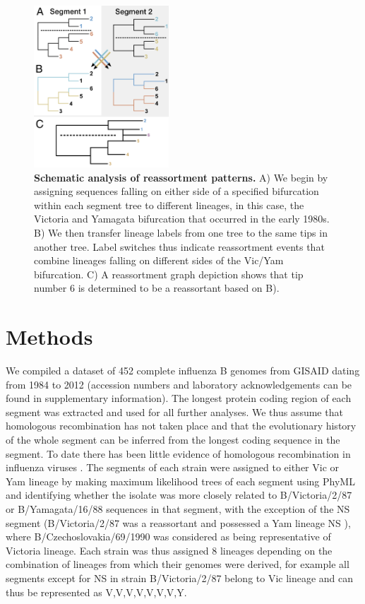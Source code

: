 \documentclass[11pt,oneside,letterpaper]{article}
\begin{document}
\begin{figure}[h]
 \centering		
	\includegraphics[width=0.45\textwidth]{figures/TreeFigure2}
	\caption{\textbf{Schematic analysis of reassortment patterns.}
	A) We begin by assigning sequences falling on either side of a specified bifurcation within each segment tree to different lineages, in this case, the Victoria and Yamagata bifurcation that occurred in the early 1980s.
	B) We then transfer lineage labels from one tree to the same tips in another tree.
	Label switches thus indicate reassortment events that combine lineages falling on different sides of the Vic/Yam bifurcation.
	C) A reassortment graph depiction shows that tip number 6 is determined to be a reassortant based on B).
	}
	\label{methodFig}
\end{figure}

\section*{Methods}
We compiled a dataset of 452 complete influenza B genomes from GISAID \cite{GISAID} dating from 1984 to 2012 (accession numbers and laboratory acknowledgements can be found in supplementary information).
The longest protein coding region of each segment was extracted and used for all further analyses.
We thus assume that homologous recombination has not taken place and that the evolutionary history of the whole segment can be inferred from the longest coding sequence in the segment.
To date there has been little evidence of homologous recombination in influenza viruses \cite{chare2003,boni2008,han2010}.
The segments of each strain were assigned to either Vic or Yam lineage by making maximum likelihood trees of each segment using PhyML \cite{guindon2003} and identifying whether the isolate was more closely related to B/Victoria/2/87 or B/Yamagata/16/88 sequences in that segment, with the exception of the NS segment (B/Victoria/2/87 was a reassortant and possessed a Yam lineage NS \cite{lindstrom1999}), where B/Czechoslovakia/69/1990 was considered as being representative of Victoria lineage.
Each strain was thus assigned 8 lineages depending on the combination of lineages from which their genomes were derived, for example all segments except for NS in strain B/Victoria/2/87 belong to Vic lineage and can thus be represented as V,V,V,V,V,V,V,Y. 
\end{document}
